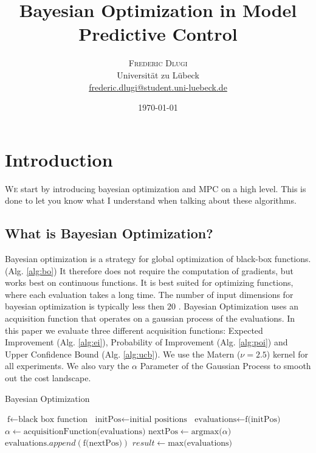 \documentclass[twoside,twocolumn]{article}
\title{Bayesian Optimization in Model Predictive Control} %
\author{%
\textsc{Frederic Dlugi}\\[1ex] %
\normalsize Universität zu Lübeck \\ %
\normalsize \href{mailto:frederic.dlugi@student.uni-luebeck.de}{frederic.dlugi@student.uni-luebeck.de} %
}
\date{\today} %
\begin{document}
\maketitle


\section{Introduction}

\lettrine[nindent=0em,lines=3]{W} e start by introducing bayesian optimization and MPC on a high level.
This is done to let you know what I understand when talking about these algorithms.

\subsection{What is Bayesian Optimization?}
Bayesian optimization is a strategy for global optimization of black-box functions. (Alg. \ref{alg:bo})
It therefore does not require the computation of gradients, but works best on continuous functions.
It is best suited for optimizing functions, where each evaluation takes a long time.
The number of input dimensions for bayesian optimization is typically less then $20$ \cite{frazier2018tutorial}.
Bayesian Optimization uses an acquisition function that operates on a gaussian process of the evaluations. In this paper we evaluate three different acquisition functions: Expected Improvement (Alg. \ref{alg:ei}), Probability of Improvement (Alg. \ref{alg:poi}) and Upper Confidence Bound (Alg. \ref{alg:ucb}). We use the Matern ($\nu=2.5$) kernel for all experiments. We also vary the $\alpha$ Parameter of the Gaussian Process to smooth out the cost landscape.

\begin{algorithm}
    \caption{Bayesian Optimization}
    \label{alg:bo}
    \begin{algorithmic}
        \State $\text{f} \gets \text{black box function}$
        \State $\text{initPos} \gets \text{initial positions}$
        \State $\text{evaluations} \gets \text{f(initPos)}$
            \State $\alpha \gets \text{acquisitionFunction(evaluations)}$
            \State $\text{nextPos} \gets \text{argmax(}\alpha\text{)}$
            \State $\text{evaluations}.append(\text{f(nextPos)})$
        \EndFor
        \State $result \gets \text{max(evaluations)}$
    \end{algorithmic}
\end{algorithm}
\end{document}
